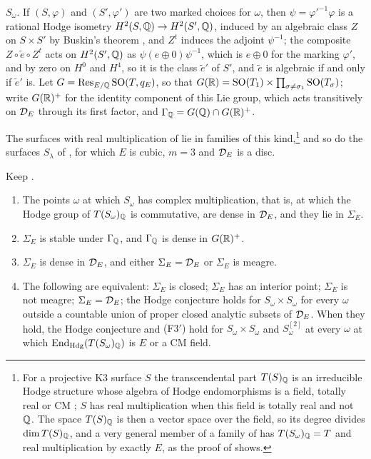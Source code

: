 \begin{setupenv}
$S_{\omega}$. If $(S,\varphi)$ and $(S',\varphi')$ are two marked choices
for $\omega$, then $\psi=\varphi'^{-1}\varphi$ is a rational Hodge isometry
$H^{2}(S,\mathbb{Q})\to H^{2}(S',\mathbb{Q})$, induced by an algebraic class $Z$ on
$S\times S'$ by Buskin's theorem \cite{Bus19}, and $Z^{t}$ induces the
adjoint $\psi^{-1}$; the composite $Z\circ\tilde e\circ Z^{t}$ acts on
$H^{2}(S',\mathbb{Q})$ as $\psi(e\oplus0)\psi^{-1}$, which is $e\oplus0$ for the
marking $\varphi'$, and by zero on $H^{0}$ and $H^{4}$, so it is the class
$\tilde e'$ of $S'$, and $\tilde e$ is algebraic if and only if $\tilde e'$
is. Let $G=\operatorname{Res}_{E/\mathbb{Q}}\operatorname{SO}(T,q_{E})$, so that
$G(\mathbb{R})=\operatorname{SO}(T_{1})\times\prod_{\sigma\ne\sigma_{1}}\operatorname{SO}(T_{\sigma})$; write
$G(\mathbb{R})^{+}$ for the identity component of this Lie group, which acts
transitively on $\mathcal{D}_{E}$ through its first factor, and
$\Gamma_{\mathbb{Q}}=G(\mathbb{Q})\cap G(\mathbb{R})^{+}$.
\end{setupenv}

The surfaces with real multiplication of \cite{vG08,vGS25} lie in families
of this kind,\footnote{For a projective K3 surface $S$ the transcendental
part $T(S)_{\mathbb{Q}}$ is an irreducible Hodge structure whose algebra of Hodge
endomorphisms is a field, totally real or CM \cite{Zar83}; $S$ has real
multiplication when this field is totally real and not $\mathbb{Q}$. The space
$T(S)_{\mathbb{Q}}$ is then a vector space over the field, so its degree divides
$\dim T(S)_{\mathbb{Q}}$, and a very general member of a family of
 has $T(S_{\omega})_{\mathbb{Q}}=T$ and real multiplication by
exactly $E$, as the proof of  shows.} and so do the surfaces $S_{\lambda}$ of ,
for which $E$ is cubic, $m=3$ and $\mathcal{D}_{E}$ is a disc.

\begin{theorem}
\label{thm:rmlocus}
Keep .
\begin{enumerate}[label=\textup{(\roman*)},leftmargin=2.6em,itemsep=2pt]
\item The points $\omega$ at which $S_{\omega}$ has complex multiplication,
  that is, at which the Hodge group of $T(S_{\omega})_{\mathbb{Q}}$ is commutative,
  are dense in $\mathcal{D}_{E}$, and they lie in $\Sigma_{E}$.
\item $\Sigma_{E}$ is stable under $\Gamma_{\mathbb{Q}}$, and $\Gamma_{\mathbb{Q}}$ is dense
  in $G(\mathbb{R})^{+}$.
\item $\Sigma_{E}$ is dense in $\mathcal{D}_{E}$, and either $\Sigma_{E}=\mathcal{D}_{E}$ or
  $\Sigma_{E}$ is meagre.
\item The following are equivalent: $\Sigma_{E}$ is closed; $\Sigma_{E}$ has
  an interior point; $\Sigma_{E}$ is not meagre; $\Sigma_{E}=\mathcal{D}_{E}$; the
  Hodge conjecture holds for $S_{\omega}\times S_{\omega}$ for every $\omega$
  outside a countable union of proper closed analytic subsets of $\mathcal{D}_{E}$.
  When they hold, the Hodge conjecture and \textup{(F3$'$)} hold for
  $S_{\omega}\times S_{\omega}$ and $S_{\omega}^{[2]}$ at every $\omega$ at
  which $\operatorname{End}_{\mathrm{Hdg}}(T(S_{\omega})_{\mathbb{Q}})$ is $E$ or a CM field.
\end{enumerate}
\end{theorem}

